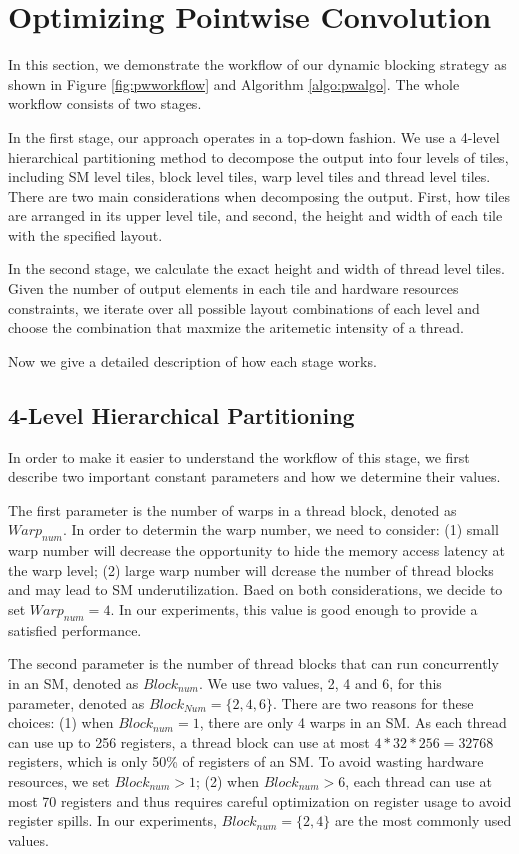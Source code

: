 \section{Optimizing Pointwise Convolution}
\label{sec:pwconv}
In this section, we demonstrate the workflow of our dynamic blocking strategy as shown in Figure \ref{fig:pwworkflow} and Algorithm \ref{algo:pwalgo}. 
The whole workflow consists of two stages. 

In the first stage, our approach operates in a top-down fashion. 
We use a 4-level hierarchical partitioning method to decompose the output into four levels of tiles, including SM level tiles, block level tiles, warp level tiles and thread level tiles. 
There are two main considerations when decomposing the output. First, how tiles are arranged in its upper level tile, and second, the height and width of each tile with the specified layout.

In the second stage, we calculate the exact height and width of thread level tiles. Given the number of output elements in each tile and hardware resources constraints, we iterate over all possible layout combinations of each level and choose the combination that maxmize the aritemetic intensity of a thread.

Now we give a detailed description of how each stage works.
\subsection{4-Level Hierarchical Partitioning}
In order to make it easier to understand the workflow of this stage, we first describe two important constant parameters and how we determine their values.

The first parameter is the number of warps in a thread block, denoted as $Warp_{num}$.
In order to determin the warp number, we need to consider: (1) small warp number will decrease the opportunity to hide the memory access latency at the warp level;
(2) large warp number will dcrease the number of thread blocks and may lead to SM underutilization.
Baed on both considerations, we decide to set $Warp_{num}=4$.
In our experiments, this value is good enough to provide a satisfied performance.

The second parameter is the number of thread blocks that can run concurrently in an SM, denoted as $Block_{num}$.
We use two values, 2, 4 and 6, for this parameter, denoted as $Block_{Num}=\{2, 4, 6\}$. 
There are two reasons for these choices: 
(1) when $Block_{num}=1$, there are only 4 warps in an SM. 
As each thread can use up to 256 registers, a thread block can use at most $4*32*256=32768$ registers, which is only 50\% of registers of an SM.
To avoid wasting hardware resources, we set $Block_{num}>1$; 
(2) when $Block_{num}>6$, each thread can use at most 70 registers and thus requires careful optimization on register usage to avoid register spills.
In our experiments, $Block_{num}=\{2, 4\}$ are the most commonly used values.

